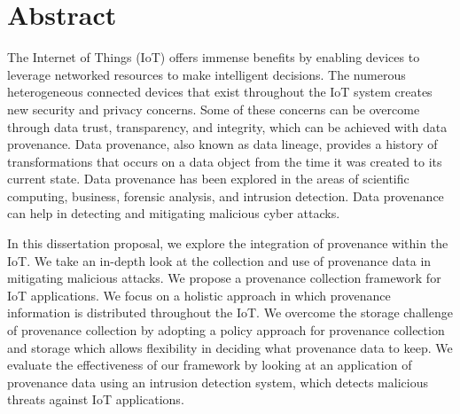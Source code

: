 

\chapter*{Abstract}
The Internet of Things (IoT) offers immense benefits by
enabling devices to leverage networked resources to make intelligent
decisions. The numerous heterogeneous connected devices that exist throughout
the IoT system creates new security and privacy concerns. Some of these concerns can
be overcome through data trust, transparency, and integrity, which can be
achieved with data provenance. Data provenance, also known as data lineage, provides a history of transformations that occurs on a data object from the time it was created to its current state. Data provenance has been explored in the areas of scientific computing,  business, forensic analysis, and intrusion detection. Data provenance can help in detecting and mitigating malicious cyber attacks.  \par In this dissertation proposal, we explore the integration of provenance within the IoT. We take an in-depth look at the collection and use of provenance data in mitigating malicious attacks. We propose a provenance collection framework for IoT applications. We focus on a holistic approach in which provenance information is distributed throughout the IoT.  We overcome the storage challenge of provenance collection by adopting a policy approach for provenance collection and storage which allows flexibility in deciding what provenance data to keep. We evaluate the effectiveness of our framework by looking at an application of provenance data using an intrusion detection system, which detects malicious threats against IoT applications.


